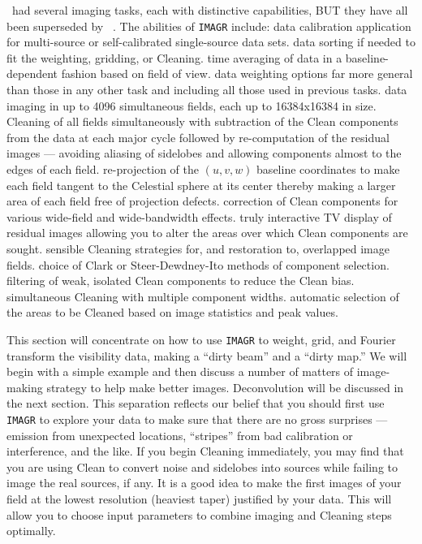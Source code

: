    \AIPS\ had several imaging tasks, each with distinctive
capabilities, BUT they have all been superseded by {\tt
{}}\@.  The abilities of {\tt IMAGR} include:
\xben
\Item data calibration application for multi-source or
   self-calibrated single-source data sets.
\Item data sorting if needed to fit the weighting, gridding, or
   Cleaning.
\Item time averaging of data in a baseline-dependent fashion based on
   field of view.
\Item data weighting options far more general than those in
   any other task and including all those used in previous tasks.
\Item data imaging in up to 4096 simultaneous fields, each up to
   16384x16384 in size.
\Item Cleaning of all fields simultaneously with subtraction of
   the Clean components from the data at each major cycle followed by
   re-computation of the residual images --- avoiding aliasing of
   sidelobes and allowing components almost to the edges of each
   field.
\Item re-projection of the $(u, v, w)$ baseline coordinates to
   make each field tangent to the Celestial sphere at its center
   thereby making a larger area of each field free of projection
   defects.
\Item correction of Clean components for various wide-field and
   wide-bandwidth effects.
\Item truly interactive TV display of residual images allowing
   you to alter the areas over which Clean components are sought.
\Item sensible Cleaning strategies for, and restoration to, overlapped
   image fields.
\Item choice of Clark or Steer-Dewdney-Ito methods of component
   selection.
\Item filtering of weak, isolated Clean components to reduce the Clean
   bias.
\Item simultaneous Cleaning with multiple component widths.
\Item automatic selection of the areas to be Cleaned based on image
   statistics and peak values.
\xeen

     This section will concentrate on how to use {\tt IMAGR} to
weight, grid, and Fourier transform the visibility data, making a
``dirty beam'' and a ``dirty map.''  We will begin with a simple
example and then discuss a number of matters of image-making strategy
to help make better images.  Deconvolution will be discussed in the
next section.  This separation reflects our belief that you should
first use {\tt IMAGR} to explore your data to make sure that there are
no gross surprises --- emission from unexpected locations, ``stripes''
from bad calibration or interference, and the like.  If you begin
Cleaning immediately, you may find that you are using Clean to convert
noise and sidelobes into sources while failing to image the real
sources, if any.  It is a good idea to make the first images of your
field at the lowest resolution (heaviest taper) justified by your
data.  This will allow you to choose input parameters to combine
imaging and Cleaning steps optimally.

